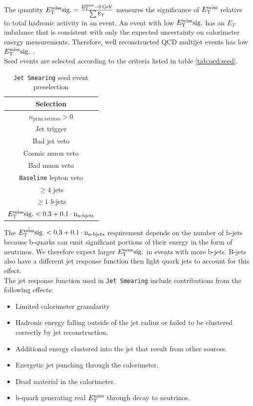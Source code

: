 \indent The quantity $E_{\mathrm{T}}^{\mathrm{miss}}\rm{sig.}=\frac{ E_{\mathrm{T}}^{\mathrm{miss}}-8\rm{\,GeV} } {\sum E_\mathrm{T} }$ measures the significance of $E_{\mathrm{T}}^{\mathrm{miss}}$ relative to total hadronic activity in an event.  An event with low $E_{\mathrm{T}}^{\mathrm{miss}}\rm{sig.}$ has an $E_T$ imbalance that is consistent with only the expected uncertainty on calorimeter energy measurements.   Therefore, well reconstructed QCD multijet events has low $E_{\mathrm{T}}^{\mathrm{miss}}\rm{sig.}$ .  \\

\indent Seed events are selected according to the criteria listed in table \ref{tab:qcd:seed}. \\

 \begin{table}[h!]
 \begin{center}
 \begin{tabular}{c} \hline
   Selection \\ \hline
   $n_\mathrm{prim. vertices} > 0$\\
   Jet trigger\\
   Bad jet veto\\
   Cosmic muon veto\\
   Bad muon veto\\
   {\tt Baseline} lepton veto\\
   $\geq 4$ jets\\
   $\geq 1$ $b$-jets\\
   $E_{\mathrm{T}}^{\mathrm{miss}}\rm{sig.} < 0.3 + 0.1\cdot n_{\textup{n-bjets}}$ \\ \hline
 \end{tabular}
 \end{center}
 \caption{{\tt Jet Smearing} seed event preselection}
 \label{tb:seed_events_presel}
 \end{table}

\indent The $E_{\mathrm{T}}^{\mathrm{miss}}\rm{sig.} < 0.3 + 0.1\cdot n_{\textup{n-bjets}}$ requirement depends on the number of b-jets because b-quarks can emit significant portions of their energy in the form of neutrinos.  We therefore expect larger $E_{\mathrm{T}}^{\mathrm{miss}}\rm{sig.}$ in events with more b-jets.  B-jets also have a different jet response function then light quark jets to account for this effect. \\

\indent The jet response function used in {\tt Jet Smearing} include contributions from the following effects: \\

\begin{itemize}
\item Limited calorimeter granularity
\item Hadronic energy falling outside of the jet radius or failed to be clustered correctly by jet reconstruction.
\item Additional energy clustered into the jet that result from other sources.
\item Energetic jet punching through the calorimeter.
\item Dead material in the calorimeter.
\item b-quark generating real $E_{\mathrm{T}}^{\mathrm{miss}}$ through decay to neutrinos.  
\end{itemize}

